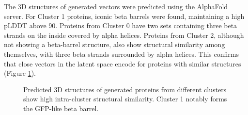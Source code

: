 \documentclass[unnumsec,webpdf,contemporary,medium]{oup-authoring-template}
\begin{document}
The 3D structures of generated vectors were predicted using the AlphaFold server. For Cluster 1 proteins, iconic beta barrels were found, maintaining a high pLDDT above 90. Proteins from Cluster 0 have two sets containing three beta strands on the inside covered by alpha helices. Proteins from Cluster 2, although not showing a beta-barrel structure, also show structural similarity among themselves, with three beta strands surrounded by alpha helices. This confirms that close vectors in the latent space encode for proteins with similar structures (Figure \ref{fig:structures}).

\begin{figure}[!ht]
    \centering
    \hspace{0.03\textwidth}
    \hspace{0.03\textwidth}
    \caption{Predicted 3D structures of generated proteins from different clusters show high intra-cluster structural similarity. Cluster 1 notably forms the GFP-like beta barrel.}
    \label{fig:structures}
\end{figure}
\end{document}
